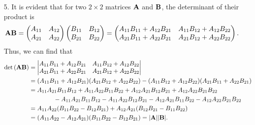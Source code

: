 \documentclass[a4paper]{book}
\newcounter{solution}[chapter]
\renewcommand\det[1]{\mathrm{det\left(#1\right)}}
\newcommand{\A}{{\bf A}}
\newcommand{\B}{{\bf B}}
\begin{document}
\begin{solution}
\begin{itemize}
	\item[5.] It is evident that for two $2\times2$ matrices $\A$ and $\B$, the determinant of their product is
	\[
		\A \B = \begin{pmatrix}
			A_{11} & A_{12} \\ A_{21} & A_{22} 
		\end{pmatrix} \begin{pmatrix}
			B_{11} & B_{12} \\ B_{21} & B_{22} 
		\end{pmatrix} = \begin{pmatrix}
			A_{11} B_{11} + A_{12} B_{21} & A_{11} B_{12} + A_{12} B_{22} \\
			A_{21} B_{11} + A_{22} B_{21} & A_{21} B_{12} + A_{22} B_{22}
		\end{pmatrix} .
	\]
	Thus, we can find that
	\begin{align*}
		\det{\A \B} &= \begin{vmatrix}
			A_{11} B_{11} + A_{12} B_{21} & A_{11} B_{12} + A_{12} B_{22} \\
			A_{21} B_{11} + A_{22} B_{21} & A_{21} B_{12} + A_{22} B_{22}
		\end{vmatrix} \\
		&= ( A_{11} B_{11} + A_{12} B_{21} ) ( A_{21} B_{12} + A_{22} B_{22} ) - ( A_{11} B_{12} + A_{12} B_{22} ) ( A_{21} B_{11} + A_{22} B_{21} ) \\
		&= A_{11} A_{21} B_{11} B_{12} + A_{11} A_{22} B_{11} B_{22} + A_{12} A_{21} B_{12} B_{21} + A_{12} A_{22} B_{21} B_{22} \\
		&\hspace{4em} - A_{11} A_{21} B_{11} B_{12} - A_{11} A_{22} B_{12} B_{21} - A_{12} A_{21} B_{11} B_{22} - A_{12} A_{22} B_{21} B_{22} \\
		&= A_{11} A_{22} ( B_{11} B_{22} - B_{12} B_{21} ) + A_{12} A_{21} ( B_{12} B_{21} - B_{11} B_{22} ) \\
		&= ( A_{11} A_{22} - A_{12} A_{21} ) ( B_{11} B_{22} - B_{12} B_{21} ) = | \A | | \B | .
	\end{align*}
	
	\end{itemize}		
	
	\end{solution}
	
\end{document}
